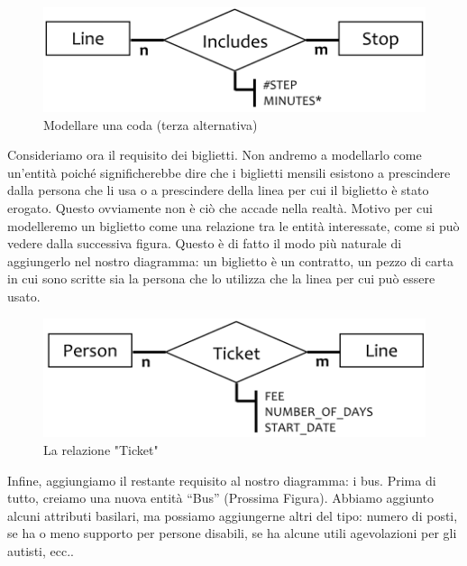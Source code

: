 \begin{itemize}
\begin{itemize}
\end{itemize}

\begin{center}
\begin{figure}[H]
\centering
\includegraphics[scale=1]{figures/queue_final.png}
\caption{Modellare una coda (terza alternativa)} 
\end{figure}
\end{center}

\end{itemize}

Consideriamo ora il requisito dei biglietti. Non andremo a modellarlo come un’entità poiché significherebbe dire che i biglietti mensili esistono a prescindere dalla persona che li usa o a prescindere della linea per cui il biglietto è stato erogato. Questo ovviamente non è ciò che accade nella realtà. Motivo per cui modelleremo un biglietto come una relazione tra le entità interessate, come si può vedere dalla successiva figura. Questo è di fatto il modo più naturale di aggiungerlo nel nostro diagramma: un biglietto è un contratto, un pezzo di carta in cui sono scritte sia la persona che lo utilizza che la linea per cui può essere usato.

\begin{center}
\begin{figure}[H]
\centering
\includegraphics[scale=1]{figures/ticket_bus.png}
\caption{La relazione "Ticket"} 
\end{figure}
\end{center}

Infine, aggiungiamo il restante requisito al nostro diagramma: i bus. Prima di tutto, creiamo una nuova entità “Bus” (Prossima Figura). Abbiamo aggiunto alcuni attributi basilari, ma possiamo aggiungerne altri del tipo: numero di posti, se ha o meno supporto per persone disabili, se ha alcune utili agevolazioni per gli autisti, ecc..

